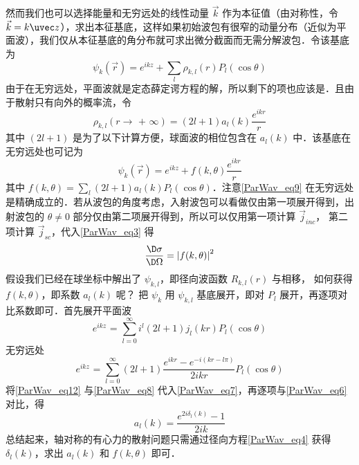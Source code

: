 然而我们也可以选择能量和无穷远处的线性动量 $\vec k$ 作为本征值（由对称性，令 $\vec k=k\uvec z$），求出本征基底，这样如果初始波包有很窄的动量分布（近似为平面波），我们仅从本征基底的角分布就可求出微分截面而无需分解波包．令该基底为
\begin{equation}\label{ParWav_eq7}
{\psi _k}(\vec r) = {e^{ikz}} + \sum\limits_l {{\rho _{k,l}}(r){P_l}(\cos \theta )} 
\end{equation}
由于在无穷远处，平面波就是定态薛定谔方程的解，所以剩下的项也应该是．且由于散射只有向外的概率流，令
\begin{equation}\label{ParWav_eq8}
{\rho _{k,l}}(r \to {\text{ + }}\infty ) = (2l + 1){a_l}(k)\frac{{{e^{ikr}}}}{r}
\end{equation}
其中 $(2l + 1)$ 是为了以下计算方便，球面波的相位包含在 ${a_l}(k)$ 中．该基底在无穷远处也可记为
\begin{equation}\label{ParWav_eq9}
{\psi _k}(\vec r) = {e^{ikz}} + f(k,\theta )\frac{{{e^{ikr}}}}{r}
\end{equation}
其中 $f(k,\theta ) = \sum\limits_l {(2l + 1){a_l}(k){P_l}(\cos \theta )}$．注意\autoref{ParWav_eq9} 在无穷远处是精确成立的．若从波包的角度考虑，入射波包可以看做仅由第一项展开得到，出射波包的 $\theta  \ne 0$ 部分仅由第二项展开得到，所以可以仅用第一项计算 ${\vec j_{inc}}$， 第二项计算 ${\vec j_{sc}}$，代入\autoref{ParWav_eq3} 得
\begin{equation}
\frac{{\D \sigma }}{{\D \Omega }} = {\left| {f(k,\theta )} \right|^2}
\end{equation}
假设我们已经在球坐标中解出了 ${\psi _{k,l}}$，即径向波函数 ${R_{k,l}}(r)$ 与相移， 如何获得 $f(k,\theta )$，即系数 ${a_l}(k)$ 呢？ 把 ${\psi _k}$ 用 $\psi_{k,l}$ 基底展开，即对 ${P_l}$ 展开，再逐项对比系数即可．首先展开平面波
\begin{equation}
{e^{ikz}}{\text{ = }}\sum\limits_{l = 0}^\infty  {{i^l}(2l + 1){j_l}(kr){P_l}(\cos \theta )} 
\end{equation}
无穷远处
\begin{equation}\label{ParWav_eq12}
{e^{ikz}}{\text{ = }}\sum\limits_{l = 0}^\infty  {(2l + 1)\frac{{{e^{ikr}} - {e^{ - i(kr - l\pi )}}}}{{2ikr}}{P_l}(\cos \theta )} 
\end{equation}
将\autoref{ParWav_eq12} 与\autoref{ParWav_eq8} 代入\autoref{ParWav_eq7}，再逐项与\autoref{ParWav_eq6} 对比，得
\begin{equation}
{a_l}(k) = \frac{{{e^{2i{\delta _l}(k)}} - 1}}{{2ik}}
\end{equation}
总结起来，轴对称的有心力的散射问题只需通过径向方程\autoref{ParWav_eq4} 获得 ${\delta _l}(k)$，求出 ${a_l}(k)$ 和 $f(k,\theta )$ 即可．

